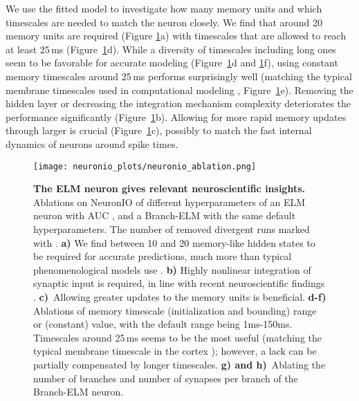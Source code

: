 \documentclass{article} \usepackage{iclr2024_doc_style,times}
\begin{document}
We use the fitted model to investigate how many memory units and which timescales are needed to match the neuron closely. We find that around 20 memory units are required (Figure \ref{fig:neuronio_ablation}a) with timescales that are allowed to reach at least 25\,ms  (Figure~\ref{fig:neuronio_ablation}d). While a diversity of timescales including long ones seem to be favorable for accurate modeling (Figure~\ref{fig:neuronio_ablation}d and \ref{fig:neuronio_ablation}f), using constant memory timescales around 25\,ms performs surprisingly well (matching the typical membrane timescales used in computational modeling \cite{dayan2005theoretical}, Figure~\ref{fig:neuronio_ablation}e). Removing the hidden layer or decreasing the integration mechanism complexity deteriorates the performance significantly (Figure~\ref{fig:neuronio_ablation}b). Allowing for more rapid memory updates through larger  is crucial (Figure~\ref{fig:neuronio_ablation}c), possibly to match the fast internal dynamics of neurons around spike times.

\begin{figure}[t]
\centering
    \centering
    \texttt{[image: neuronio\_plots/neuronio\_ablation.png]}
    \caption{\textbf{The ELM neuron gives relevant neuroscientific insights.} Ablations on NeuronIO of different hyperparameters of an \textcolor{blueVar}{ELM} neuron with AUC , and a  \textcolor{lightblueVar}{Branch-ELM} with the same default hyperparameters. The number of removed divergent runs marked with . \textbf{a)} We find between 10 and 20 memory-like hidden states to be required for accurate predictions, much more than typical phenomenological models use \cite{izhikevich2004model,dayan2005theoretical}. \textbf{b)} Highly nonlinear integration of synaptic input is required, in line with recent neuroscientific findings \cite{stuart2015dendritic,jones2022biological,larkum2022dendrites}. \textbf{c)}~Allowing greater updates to the memory units is beneficial.
    \textbf{d-f)} Ablations of memory timescale (initialization and bounding) range or (constant) value, with the default range being 1ms-150ms. Timescales around 25\,ms seems to be the most useful (matching the typical membrane timescale in the cortex \cite{dayan2005theoretical}); however, a lack can be partially compensated by longer timescales. \textbf{g) and h)}~Ablating the number of branches  and number of synapses per branch  of the  \textcolor{lightblueVar}{Branch-ELM} neuron.}
    \label{fig:neuronio_ablation}
    \vspace{-10pt} \end{figure}
\end{document}
